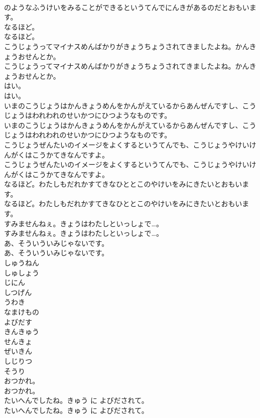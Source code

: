\documentclass[8pt]{extreport}
\begin{document}
\begin{CJK}{UTF8}{min}
\\	のようなふうけいをみることができるというてんでにんきがあるのだとおもいます。
\\	なるほど。
\\	なるほど。
\\	こうじょうってマイナスめんばかりがきょうちょうされてきましたよね。かんきょうおせんとか。
\\	こうじょうってマイナスめんばかりがきょうちょうされてきましたよね。かんきょうおせんとか。
\\	はい。
\\	はい。
\\	いまのこうじょうはかんきょうめんをかんがえているからあんぜんですし、こうじょうはわれわれのせいかつにひつようなものです。
\\	いまのこうじょうはかんきょうめんをかんがえているからあんぜんですし、こうじょうはわれわれのせいかつにひつようなものです。
\\	こうじょうぜんたいのイメージをよくするというてんでも、こうじょうやけいけんがくはこうかてきなんですよ。
\\	こうじょうぜんたいのイメージをよくするというてんでも、こうじょうやけいけんがくはこうかてきなんですよ。
\\	なるほど。わたしもだれかすてきなひととこのやけいをみにきたいとおもいます。
\\	なるほど。わたしもだれかすてきなひととこのやけいをみにきたいとおもいます。
\\	すみませんねぇ。きょうはわたしといっしょで…。
\\	すみませんねぇ。きょうはわたしといっしょで…。
\\	あ、そういういみじゃないです。
\\	あ、そういういみじゃないです。
\\	しゅうねん
\\	しゅしょう
\\	じにん
\\	しつげん
\\	うわき
\\	なまけもの
\\	よびだす
\\	きんきゅう
\\	せんきょ
\\	ぜいきん
\\	しじりつ
\\	そうり
\\	おつかれ。
\\	おつかれ。
\\	たいへんでしたね。きゅう に よびだされて。
\\	たいへんでしたね。きゅう に よびだされて。

\end{CJK}
\end{document}
